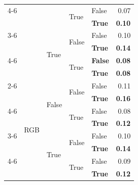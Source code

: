 \begin{tabular}{@{}lllllr@{}}
    \cmidrule{4-6}                  
                                            &                                   &                           & \multirow[c]{2}{*}{True}  & False                 & 0.07 \\
                                            &                                   &                           &                           & \textbf{True}         & \textbf{0.10} \\
    \cmidrule{3-6}                  
                                            &                                   & \multirow[c]{4}{*}{True}  & \multirow[c]{2}{*}{False} & False                 & 0.10 \\
                                            &                                   &                           &                           & \textbf{True}         & \textbf{0.14} \\
    \cmidrule{4-6}                  
                                            &                                   &                           & \multirow[c]{2}{*}{True}  & \textbf{False}        & \textbf{0.08} \\
                                            &                                   &                           &                           & \textbf{True}         & \textbf{0.08} \\
    \cmidrule{2-6}                  
                                            & \multirow[c]{9}{*}{RGB}           & \multirow[c]{4}{*}{False} & \multirow[c]{2}{*}{False} & False                 & 0.11 \\
                                            &                                   &                           &                           & \textbf{True}         & \textbf{0.16} \\
    \cmidrule{4-6}                  
                                            &                                   &                           & \multirow[c]{2}{*}{True}  & False                 & 0.08 \\
                                            &                                   &                           &                           & \textbf{True}         & \textbf{0.12} \\
    \cmidrule{3-6}                  
                                            &                                   & \multirow[c]{4}{*}{True}  & \multirow[c]{2}{*}{False} & False                 & 0.10 \\
                                            &                                   &                           &                           & \textbf{True}         & \textbf{0.14} \\
    \cmidrule{4-6}                  
                                            &                                   &                           & \multirow[c]{2}{*}{True}  & False                 & 0.09 \\
                                            &                                   &                           &                           & \textbf{True}         & \textbf{0.12} \\
   \bottomrule
\end{tabular}
